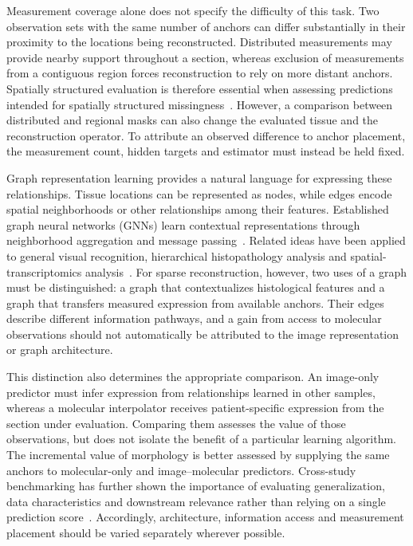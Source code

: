 Measurement coverage alone does not specify the difficulty of this task. Two observation sets with the same number of anchors can differ substantially in their proximity to the locations being reconstructed. Distributed measurements may provide nearby support throughout a section, whereas exclusion of measurements from a contiguous region forces reconstruction to rely on more distant anchors. Spatially structured evaluation is therefore essential when assessing predictions intended for spatially structured missingness~\cite{roberts2017}. However, a comparison between distributed and regional masks can also change the evaluated tissue and the reconstruction operator. To attribute an observed difference to anchor placement, the measurement count, hidden targets and estimator must instead be held fixed.

Graph representation learning provides a natural language for expressing these relationships. Tissue locations can be represented as nodes, while edges encode spatial neighborhoods or other relationships among their features. Established graph neural networks (GNNs) learn contextual representations through neighborhood aggregation and message passing~\cite{kipf2017,hamilton2017,gilmer2017}. Related ideas have been applied to general visual recognition, hierarchical histopathology analysis and spatial-transcriptomics analysis~\cite{han2022vig,pati2022hact,hu2021spagcn}. For sparse reconstruction, however, two uses of a graph must be distinguished: a graph that contextualizes histological features and a graph that transfers measured expression from available anchors. Their edges describe different information pathways, and a gain from access to molecular observations should not automatically be attributed to the image representation or graph architecture.

This distinction also determines the appropriate comparison. An image-only predictor must infer expression from relationships learned in other samples, whereas a molecular interpolator receives patient-specific expression from the section under evaluation. Comparing them assesses the value of those observations, but does not isolate the benefit of a particular learning algorithm. The incremental value of morphology is better assessed by supplying the same anchors to molecular-only and image--molecular predictors. Cross-study benchmarking has further shown the importance of evaluating generalization, data characteristics and downstream relevance rather than relying on a single prediction score~\cite{wang2025}. Accordingly, architecture, information access and measurement placement should be varied separately wherever possible.

